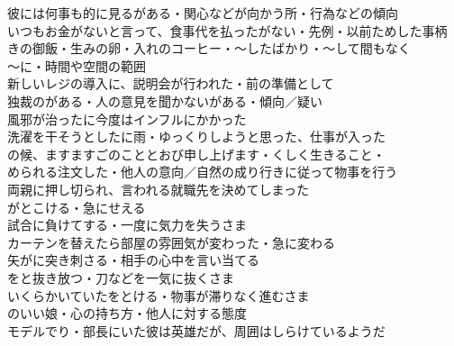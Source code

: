 彼には何事も的に見るがある・関心などが向かう所・行為などの傾向\\
いつもお金がないと言って、食事代を払ったがない・先例・以前ためした事柄\\
きの御飯・生みの卵・入れのコーヒー・〜したばかり・〜して間もなく\\

〜に・時間や空間の範囲\\
新しいレジの導入に、説明会が行われた・前の準備として\\
独裁のがある・人の意見を聞かないがある・傾向／疑い\\

風邪が治ったに今度はインフルにかかった\\
洗濯を干そうとしたに雨・ゆっくりしようと思った、仕事が入った\\
の候、ますますごのこととおび申し上げます・くしく生きること・\\

められる注文した・他人の意向／自然の成り行きに従って物事を行う\\
両親に押し切られ、言われる就職先を決めてしまった\\

がとこける・急にせえる\\
試合に負けてする・一度に気力を失うさま\\
カーテンを替えたら部屋の雰囲気が変わった・急に変わる\\
矢がに突き刺さる・相手の心中を言い当てる\\
をと抜き放つ・刀などを一気に抜くさま\\
いくらかいていたをとける・物事が滞りなく進むさま\\

のいい娘・心の持ち方・他人に対する態度\\
モデルでり・部長にいた彼は英雄だが、周囲はしらけているようだ\\

